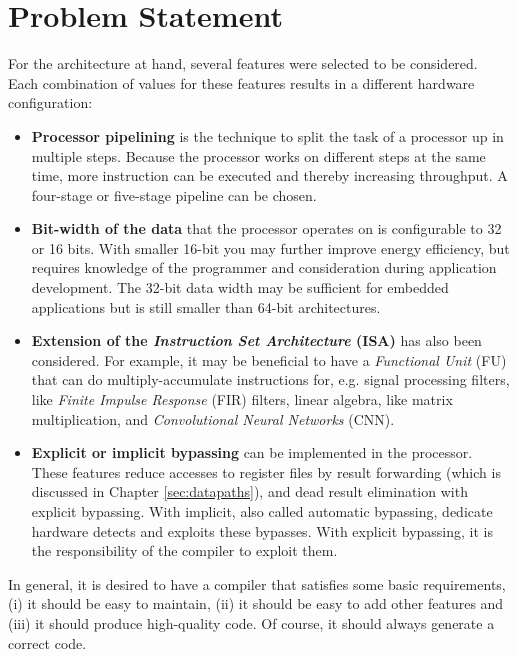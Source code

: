 \section{Problem Statement}
For the architecture at hand, several features were selected to be considered. Each combination of values for these features results in a different hardware configuration:
\begin{itemize}
\item \textbf{Processor pipelining} is the technique to split the task of a processor up in multiple steps. Because the processor works on different steps at the same time, more instruction can be executed and thereby increasing throughput. A four-stage or five-stage pipeline can be chosen. %
\item	\textbf{Bit-width of the data} that the processor operates on is configurable to 32 or 16 bits. With smaller 16-bit you may further improve energy efficiency, but requires knowledge of the programmer and consideration during application development. The 32-bit data width may be sufficient for embedded applications but is still smaller than 64-bit architectures.
\item	\textbf{Extension of the \emph{Instruction Set Architecture} (ISA)} has also been considered. For example, it may be beneficial to have a  \emph{Functional Unit} (FU) that can do multiply-accumulate instructions for, e.g. signal processing filters, like \emph{Finite Impulse Response} (FIR) filters, linear algebra, like matrix multiplication, and \emph{Convolutional Neural Networks} (CNN). %
\item \textbf{Explicit or implicit bypassing} can be implemented in the processor. These features reduce accesses to register files by result forwarding (which is discussed in Chapter \ref{sec:datapaths}), and dead result elimination with explicit bypassing. With implicit, also called automatic bypassing, dedicate hardware detects and exploits these bypasses. With explicit bypassing, it is the responsibility of the compiler to exploit them.
\end{itemize}

In general, it is desired to have a compiler that satisfies some basic requirements, (i) it should be easy to maintain, (ii) it should be easy to add other features and (iii) it should produce high-quality code. Of course, it should always generate a correct code.

